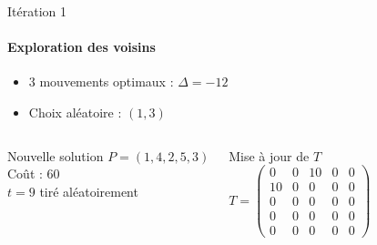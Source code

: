 \documentclass{beamer}
\begin{document}
\begin{frame}{Itération 1 }
    \framesubtitle{Exploration des voisins}


    \begin{itemize}
        \item 3 mouvements optimaux : \( \Delta = -12 \)
        \item Choix aléatoire : \( (1,3) \)
    \end{itemize}

    \begin{columns}
        \begin{alertblock}{Nouvelle solution}
            \( P = (1, 4, 2, 5, 3) \) \\
            Coût : 60 \\
            \( t = 9 \) tiré aléatoirement
        \end{alertblock}

        \begin{exampleblock}{Mise à jour de \( T \)}
            \[
                T = \begin{pmatrix}
                    0  & 0 & 10 & 0 & 0 \\
                    10 & 0 & 0  & 0 & 0 \\
                    0  & 0 & 0  & 0 & 0 \\
                    0  & 0 & 0  & 0 & 0 \\
                    0  & 0 & 0  & 0 & 0
                \end{pmatrix}
            \]
        \end{exampleblock}
    \end{columns}
\end{frame}
\end{document}
